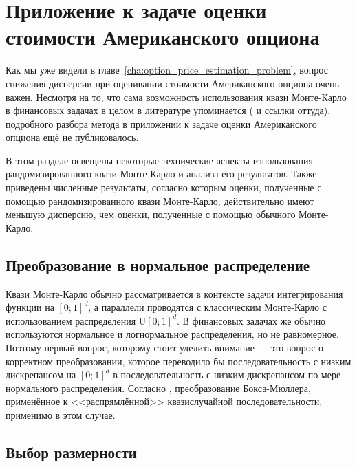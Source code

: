 \documentclass[specialist,
               substylefile = ../spbu.rtx,
               subf,href,colorlinks=true, 12pt]{disser}
\begin{document}

\section{Приложение к задаче оценки стоимости Американского опциона} %
\label{sec:monte_carlo_in_option_pricing}

Как мы уже видели в главе~\ref{cha:option_price_estimation_problem}, вопрос снижения дисперсии при оценивании стоимости Американского опциона очень важен. Несмотря на то, что сама возможность использования квази Монте-Карло в финансовых задачах в целом в литературе упоминается (\cite[глава~5]{Glasserman2004} и ссылки оттуда), подробного разбора метода в приложении к задаче оценки Американского опциона ещё не публиковалось.

В этом разделе освещены некоторые технические аспекты изпользования рандомизированного квази Монте-Карло и анализа его результатов. Также приведены численные результаты, согласно которым оценки, полученные с помощью рандомизированного квази Монте-Карло, действительно имеют меньшую дисперсию, чем оценки, полученные с помощью обычного Монте-Карло.

\subsection{Преобразование в нормальное распределение} %
\label{sub:uniform_normal_transform}

Квази Монте-Карло обычно рассматривается в контексте задачи интегрирования функции на $\left[0;1\right]^d$, а параллели проводятся с классическим Монте-Карло с использованием распределения $\mathrm U\left[0;1\right]^d$. В финансовых задачах же обычно используются нормальное и логнормальное распределения, но не равномерное. Поэтому первый вопрос, которому стоит уделить внимание --- это вопрос о корректном преобразовании, которое переводило бы последовательность с низким дискрепансом на $\left[0;1\right]^d$ в последовательность с низким дискрепансом по мере нормального распределения. Согласно \cite{Oekten2011}, преобразование Бокса-Мюллера, применённое к <<распрямлённой>> квазислучайной последовательности, применимо в этом случае.


\subsection{Выбор размерности} %
\label{sub:choice_of_dimension}
\end{document}

